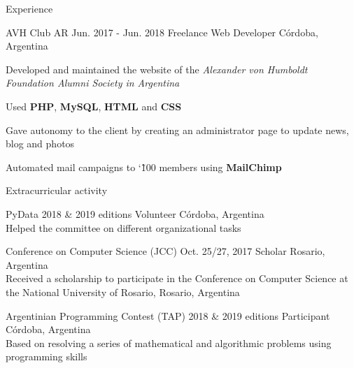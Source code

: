 \documentclass{curriculum}
\begin{document}
\begin{cvsection}{Experience}

    \makesectionitemheader
        {AVH Club AR}                   {Jun. 2017 - Jun. 2018}
        {Freelance Web Developer}       {Córdoba, Argentina}
        \begin{sectionitemlist}
        \item{Developed and maintained the website of the \textit{Alexander von Humboldt Foundation Alumni Society in Argentina}}
        \item{Used \textbf{PHP}, \textbf{MySQL}, \textbf{HTML} and \textbf{CSS}}
        \item{Gave autonomy to the client by creating an administrator page to update news, blog and photos}
        \item{Automated mail campaigns to  \char`\~ 100 members using \textbf{MailChimp}}
        \end{sectionitemlist}

\end{cvsection}


\begin{cvsection}{Extracurricular activity}

    \makesectionitemheader
        {PyData}                                      {2018 \& 2019 editions}
        {Volunteer}                                   {Córdoba, Argentina} \\
        \vspace{0.5ex}
        {Helped the committee on different organizational tasks}

    \makesectionitemheader
        {Conference on Computer Science (JCC)}        {Oct. 25/27, 2017}
        {Scholar}                                     {Rosario, Argentina} \\
        \vspace{0.5ex}
        {Received a scholarship to participate in the Conference on Computer Science at the National University of Rosario, Rosario, Argentina}

    \makesectionitemheader
        {Argentinian Programming Contest (TAP)}       {2018 \& 2019 editions}
        {Participant}                                 {Córdoba, Argentina} \\
        \vspace{0.5ex}
        {Based on resolving a series of mathematical and algorithmic problems using programming skills}

\end{cvsection}

\end{document}
